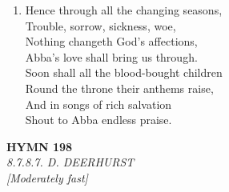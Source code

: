\documentclass[11pt,a4paper]{article}
\begin{document}
\begin{enumerate}
    \item Hence through all the changing seasons, \\
        Trouble, sorrow, sickness, woe, \\
        Nothing changeth God's affections, \\
        Abba's love shall bring us through. \\
        Soon shall all the blood-bought children \\
        Round the throne their anthems raise, \\
        And in songs of rich salvation \\
        Shout to Abba endless praise.

\end{enumerate}

\newpage
\begin{center}
    {\Large \textbf{HYMN 198}}
    \\
    \textit{8.7.8.7. D. DEERHURST}
    \\
    \textit{\small [Moderately fast]}
\end{center}
\vspace{1em}
\end{document}
